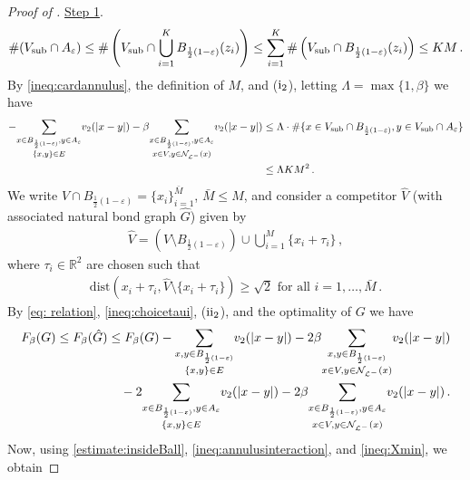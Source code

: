\documentclass[reqno]{amsart}
\newcommand{\eps}{\varepsilon}
\theoremstyle{plain}
\newenvironment{step}[1]{\underline{Step #1}.}{}
\theoremstyle{definition}
\numberwithin{equation}{section}
\begin{document}
\begin{proof}[Proof of ]
\begin{step}{1}
\begin{align}\label{ineq:cardannulus}
\#(V_{\rm sub} \cap A_\eps) \leq \#\left(V_{\rm sub}\cap  \bigcup_{i=1}^K B_{\frac{1}{2}(1-\varepsilon)}(z_i)\right)\leq \sum_{i=1}^K \#\left(V_{\rm sub}  \cap  B_{\frac{1}{2}(1-\varepsilon)}(z_i)\right)\leq K M\,.
\end{align}
By \eqref{ineq:cardannulus}, the definition of $M$, and {($\rm i_2$)}, letting $\Lambda = \max\{1,  \beta\}$ we have
\begin{align}\label{ineq:annulusinteraction}
-\underset{\{x,y\} \in E}{\sum_{x \in B_{\frac{1}{2}(1-\varepsilon)}, y \in A_\eps}} v_2(|x-y|)  -   \beta  \underset{x \in V, y\in \mathcal{N}_{\mathcal{L}^-}(x) }{\sum_{x \in B_{\frac{1}{2}(1-\varepsilon)}, y \in A_\eps}}  v_2(|x-y|)  & \leq \Lambda \cdot \#\{x \in V_{\rm sub} \cap B_{\frac{1}{2}(1-\varepsilon)}, y \in V_{\rm sub} \cap A_\eps\} \notag \\ & \leq  \Lambda KM^2\,.
\end{align}
We write $V\cap B_{\frac{1}{2}(1-\varepsilon)} =  \{x_i\}_{i=1}^{\bar{M}} $,  $\bar{M}\le M$, and consider  a competitor $\hat{V}$ (with associated natural  bond graph $\hat{G}$) given by
\begin{align*}
\hat{V} = (V \setminus B_{\frac{1}{2}(1-\varepsilon)}) \cup \bigcup_{i=1}^M \{x_i +\tau_i\}\,,
\end{align*}
where $\tau_i \in \mathbb{R}^2$ are chosen such that
\begin{align}\label{ineq:choicetaui}
\mathrm{dist}(x_i+\tau_i, \hat{V}\setminus \{x_i+\tau_i\}) \geq \sqrt{2} \text{ for all } i=1,\ldots, \bar{M}\,.
\end{align}
By \eqref{eq: relation}, \eqref{ineq:choicetaui}, {($\rm ii_2$)},  and the optimality of $G$ we have
\begin{align}\label{ineq:Xmin}
F_\beta  (G) \leq  F_\beta  (\hat{G}) &\leq F_\beta  (G) - \underset{\{x,y\} \in E}{\sum_{x,y \in B_{\frac{1}{2}(1-\varepsilon)}}} v_2(|x-y|)-   2  \beta  \underset{x \in V, y\in \mathcal{N}_{\mathcal{L}^-}(x) }{\sum_{x,y\in  B_{\frac{1}{2}(1-\varepsilon)} }}  v_2(|x-y|)  \notag \\
& \quad  - 2 \underset{\{x,y\} \in E}{\sum_{x \in B_{\frac{1}{2}(1-\varepsilon)}, y \in A_\eps}} v_2(|x-y|) -  2  \beta  \underset{x \in V, y\in \mathcal{N}_{\mathcal{L}^-}(x) }{\sum_{x \in B_{\frac{1}{2}(1-\varepsilon)}, y \in A_\eps}}  v_2(|x-y|)  \,.
\end{align}
 Now, using  \eqref{estimate:insideBall}, \eqref{ineq:annulusinteraction}, and \eqref{ineq:Xmin}, we obtain

\end{step}
\end{proof}
\end{document}
